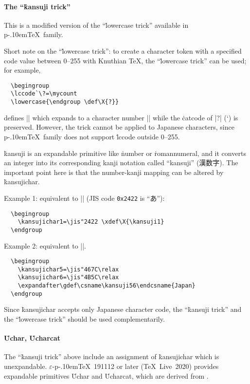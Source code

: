 \documentclass[a4paper,11pt]{article}
\def\code#1{\texttt{#1}}
\def\epTeX{$\varepsilon$-\pTeX}\def\eTeX{$\varepsilon$-\TeX}
\def\pTeX{p\kern-.10em\TeX}
\def\TL{\TeX\ Live\ }
\begin{document}
\paragraph{The ``\.{kansuji} trick''}
This is a modified version of the ``\.{lowercase} trick''
available in \pTeX\ family.

\begin{dangerous}
Short note on the ``\.{lowercase} trick'':
to create a character token with a specified code value between 0--255
with Knuthian \TeX, the ``\.{lowercase} trick'' can be used; for example,
\begin{verbatim}
  \begingroup
  \lccode`\?=\mycount
  \lowercase{\endgroup \def\X{?}}
\end{verbatim}
defines |\X| which expands to a character number |\mycount|
while the \.{catcode} of |?| (\the\catcode`\?) is preserved.
However, the trick cannot be applied to Japanese characters,
since \pTeX\ family does not support \.{lccode} outside 0--255.
\end{dangerous}

\.{kansuji} is an expandable primitive like \.{number} or \.{romannumeral},
and it converts an integer into its corresponding kanji notation
called ``kansuji'' (漢数字). The important point here is that
the number-kanji mapping can be altered by \.{kansujichar}.

Example 1: equivalent to |\def\X{あ}| (JIS code \code{0x2422} is ``あ''):
\begin{verbatim}
  \begingroup
    \kansujichar1=\jis"2422 \xdef\X{\kansuji1}
  \endgroup
\end{verbatim}

Example 2: equivalent to |\def\日本{Japan}|.
\begin{verbatim}
  \begingroup
    \kansujichar5=\jis"467C\relax
    \kansujichar6=\jis"4B5C\relax
    \expandafter\gdef\csname\kansuji56\endcsname{Japan}
  \endgroup
\end{verbatim}

Since \.{kansujichar} accepts only Japanese character code,
the ``\.{kansuji} trick'' and the ``\.{lowercase} trick'' should be
used complementarily.

\paragraph{\.{Uchar}, \.{Ucharcat}}
The ``\.{kansuji} trick'' above include an assignment of \.{kansujichar}
which is unexpandable.
\epTeX~191112 or later (\TL2020) provides expandable primitives
\.{Uchar} and \.{Ucharcat}, which are derived from .
\end{document}
